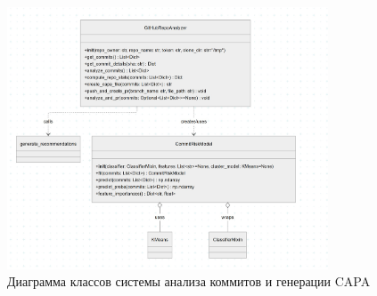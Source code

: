 \begin{figure}[ht]
	\centering
	\includegraphics[width=0.85\textwidth]{my_folder/images/classDiagram.jpg}
	\caption{Диаграмма классов системы анализа коммитов и генерации CAPA}
	\label{fig:class-diagram}
\end{figure}


